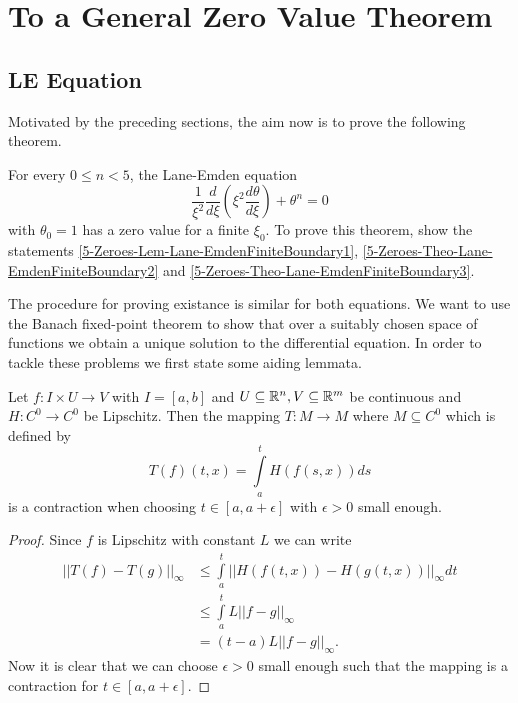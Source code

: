 \section{To a General Zero Value Theorem}
\subsection{LE Equation}
Motivated by the preceding sections, the aim now is to prove the following theorem.
\begin{theorem}
	\label{5-Zeroes-The-Lane-EmdenFiniteBoundary}
	For every $0\leq n<5$, the Lane-Emden equation
	\begin{equation}
		\frac{1}{\xi^2}\frac{d}{d\xi}\left(\xi^2\frac{d\theta}{d\xi}\right)+\theta^n=0
		\label{5-Zeroes-Equ-LEeq}
	\end{equation}
	with $\theta_0=1$ has a zero value for a finite $\xi_0$. To prove this theorem, show the statements \ref{5-Zeroes-Lem-Lane-EmdenFiniteBoundary1}, 
	\ref{5-Zeroes-Theo-Lane-EmdenFiniteBoundary2} and \ref{5-Zeroes-Theo-Lane-EmdenFiniteBoundary3}.
\end{theorem}
The procedure for proving existance is similar for both equations.
We want to use the Banach fixed-point theorem to show that over a suitably chosen space of functions we obtain a unique solution to the differential equation.
In order to tackle these problems we first state some aiding lemmata.
\begin{lemma}
	\label{5-Zeroes-Lem-Integral-Contraction}
	Let $f:I\times U\rightarrow V$ with $I=[a,b]$ and $U\subseteq\mathbb{R}^n,V\subseteq\mathbb{R}^m$ be continuous and $H:C^0\rightarrow C^0$ be Lipschitz.
	Then the mapping $T:M\rightarrow M$ where $M\subseteq C^0$ which is defined by
	\begin{equation}
		T(f)(t,x)=\int\limits_a^tH(f(s,x))ds
	\end{equation}
	is a contraction when choosing $t\in[a,a+\epsilon]$ with $\epsilon>0$ small enough.
\end{lemma}
\begin{proof}
	Since $f$ is Lipschitz with constant $L$ we can write
	\begin{align}
		||T(f)-T(g)||_\infty 	&\leq \int\limits_a^t||H(f(t,x))-H(g(t,x))||_\infty dt\\
								&\leq \int\limits_a^tL||f-g||_\infty\\
								&=(t-a)L||f-g||_\infty.
	\end{align}
	Now it is clear that we can choose $\epsilon>0$ small enough such that the mapping is a contraction for $t\in[a,a+\epsilon]$.
\end{proof}
